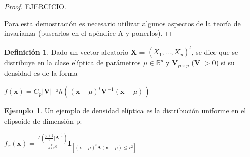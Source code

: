 \documentclass{article}
\theoremstyle{theorem-style}  %
\theoremstyle{definition}
\newtheorem{definition}{Definición}[section]
\theoremstyle{example-style}
\newtheorem{example}{Ejemplo}[section]
\begin{document}
	\begin{proof}
		EJERCICIO.
		
		Para esta demostración es necesario utilizar algunos aspectos de la teoría de invarianza (buscarlos en el apéndice A y ponerlos).
	\end{proof}

	\begin{definition}
		Dado un vector aleatorio \textbf{X} = $(X_1, ..., X_p)^t$, se dice que se distribuye en la clase elíptica de parámetros $\mu \in \mathbb{R}^p$ y \textbf{V}$_{p \times p}$ (\textbf{V} $> 0$) si su densidad es de la forma
		
		\begin{center}
		\begin{math}
			f(\textbf{x}) = C_p|\textbf{V}|^{-\frac{1}{2}}h((\textbf{x}-\mu)^t\textbf{V}^{-1}(\textbf{x}-\mu))
		\end{math}
		\end{center}
	\end{definition}

	\begin{example}
		Un ejemplo de densidad elíptica es la distribución uniforme en el elipsoide de dimensión p:
		
		\begin{center}
			\begin{math}
				f_x(\textbf{x}) = \frac{\Gamma(\frac{p+2}{2}|\textbf{A}|^\frac{1}{2})}{\pi^\frac{p}{2}r^0}\textbf{I}_{[(\textbf{x}-\mu)^t\textbf{A}(\textbf{x}-\mu)\leq r^2]}
			\end{math}
		\end{center}

	\end{example}
\end{document}
